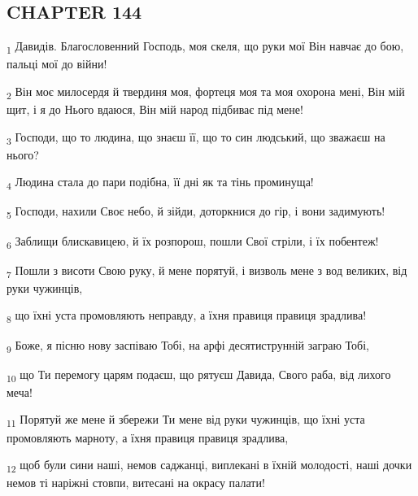\subsection{CHAPTER 144}
\begin{tcolorbox}
\textsubscript{1} Давидів. Благословенний Господь, моя скеля, що руки мої Він навчає до бою, пальці мої до війни!
\end{tcolorbox}
\begin{tcolorbox}
\textsubscript{2} Він моє милосердя й твердиня моя, фортеця моя та моя охорона мені, Він мій щит, і я до Нього вдаюся, Він мій народ підбиває під мене!
\end{tcolorbox}
\begin{tcolorbox}
\textsubscript{3} Господи, що то людина, що знаєш її, що то син людський, що зважаєш на нього?
\end{tcolorbox}
\begin{tcolorbox}
\textsubscript{4} Людина стала до пари подібна, її дні як та тінь проминуща!
\end{tcolorbox}
\begin{tcolorbox}
\textsubscript{5} Господи, нахили Своє небо, й зійди, доторкнися до гір, і вони задимують!
\end{tcolorbox}
\begin{tcolorbox}
\textsubscript{6} Заблищи блискавицею, й їх розпорош, пошли Свої стріли, і їх побентеж!
\end{tcolorbox}
\begin{tcolorbox}
\textsubscript{7} Пошли з висоти Свою руку, й мене порятуй, і визволь мене з вод великих, від руки чужинців,
\end{tcolorbox}
\begin{tcolorbox}
\textsubscript{8} що їхні уста промовляють неправду, а їхня правиця правиця зрадлива!
\end{tcolorbox}
\begin{tcolorbox}
\textsubscript{9} Боже, я пісню нову заспіваю Тобі, на арфі десятиструнній заграю Тобі,
\end{tcolorbox}
\begin{tcolorbox}
\textsubscript{10} що Ти перемогу царям подаєш, що рятуєш Давида, Свого раба, від лихого меча!
\end{tcolorbox}
\begin{tcolorbox}
\textsubscript{11} Порятуй же мене й збережи Ти мене від руки чужинців, що їхні уста промовляють марноту, а їхня правиця правиця зрадлива,
\end{tcolorbox}
\begin{tcolorbox}
\textsubscript{12} щоб були сини наші, немов саджанці, виплекані в їхній молодості, наші дочки немов ті наріжні стовпи, витесані на окрасу палати!
\end{tcolorbox}
